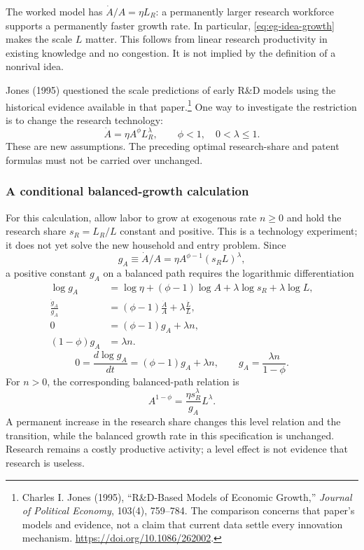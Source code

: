 The worked model has $\dot A/A=\eta L_R$: a permanently larger research
workforce supports a permanently faster growth rate. In particular,
\eqref{eq:eg-idea-growth} makes the scale $L$ matter. This follows from linear
research productivity in existing knowledge and no congestion. It is not
implied by the definition of a nonrival idea.

Jones (1995) questioned the scale predictions of early R\&D models using the
historical evidence available in that paper.\footnote{Charles I. Jones (1995),
``R\&D-Based Models of Economic Growth,'' \textit{Journal of Political Economy},
103(4), 759--784. The comparison concerns that paper's models and evidence,
not a claim that current data settle every innovation mechanism.
\url{https://doi.org/10.1086/262002}.}
One way to investigate the restriction is to change the research technology:
\begin{equation}\label{eq:eg-semi-technology}
\dot A=\eta A^\phi L_R^\lambda,\qquad
\phi<1,\quad 0<\lambda\leq1.
\end{equation}
These are new assumptions. The preceding optimal research-share and patent
formulas must not be carried over unchanged.

\subsubsection{A conditional balanced-growth calculation}

For this calculation, allow labor to grow at exogenous rate $n\geq0$ and
hold the research share $s_R=L_R/L$ constant and positive. This is a
technology experiment; it does not yet solve the new household and entry
problem. Since
\begin{equation}
g_A\equiv\dot A/A=\eta A^{\phi-1}(s_RL)^\lambda,
\end{equation}
a positive constant $g_A$ on a balanced path requires
the logarithmic differentiation
\begin{align}
\log g_A&=\log\eta+(\phi-1)\log A
                       +\lambda\log s_R+\lambda\log L,\\
\frac{\dot g_A}{g_A}&=(\phi-1)\frac{\dot A}{A}
                         +\lambda\frac{\dot L}{L},\\
0&=(\phi-1)g_A+\lambda n,\\
(1-\phi)g_A&=\lambda n.
\end{align}
\begin{equation}
0=\frac{d\log g_A}{dt}=(\phi-1)g_A+\lambda n,
\qquad g_A=\frac{\lambda n}{1-\phi}.
\end{equation}
For $n>0$, the corresponding balanced-path relation is
\begin{equation}
A^{1-\phi}=\frac{\eta s_R^\lambda}{g_A}L^\lambda.
\end{equation}
A permanent increase in the research share changes this level relation and
the transition, while the balanced growth rate in this specification is
unchanged. Research remains a costly productive activity; a level effect
is not evidence that research is useless.

